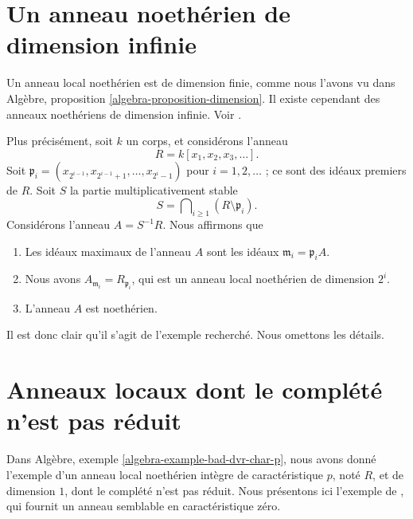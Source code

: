 \section{Un anneau noethérien de dimension infinie}
\label{section-Noetherian-infinite-dimension}

\noindent
Un anneau local noethérien est de dimension finie, comme nous l'avons vu dans
Algèbre, proposition \ref{algebra-proposition-dimension}.
Il existe cependant des anneaux noethériens de dimension infinie.
Voir \cite[Appendix, exemple 1]{Nagata}.

\medskip\noindent
Plus précisément, soit $k$ un corps, et considérons l'anneau
$$
R = k[x_1, x_2, x_3, \ldots ].
$$
Soit $\mathfrak p_i = (x_{2^{i - 1}}, x_{2^{i - 1} + 1}, \ldots, x_{2^i - 1})$
pour $i = 1, 2, \ldots$ ; ce sont des idéaux premiers de $R$. Soit $S$
la partie multiplicativement stable
$$
S = \bigcap\nolimits_{i \geq 1} (R \setminus \mathfrak p_i).
$$
Considérons l'anneau $A = S^{-1}R$.
Nous affirmons que
\begin{enumerate}
\item Les idéaux maximaux de l'anneau $A$ sont les idéaux
$\mathfrak m_i = \mathfrak p_iA$.
\item Nous avons $A_{\mathfrak m_i} = R_{\mathfrak p_i}$, qui est
un anneau local noethérien de dimension $2^i$.
\item L'anneau $A$ est noethérien.
\end{enumerate}
Il est donc clair qu'il s'agit de l'exemple recherché.
Nous omettons les détails.




\section{Anneaux locaux dont le complété n'est pas réduit}
\label{section-local-completion-nonreduced}

\noindent
Dans Algèbre, exemple \ref{algebra-example-bad-dvr-char-p}, nous avons donné l'exemple
d'un anneau local noethérien intègre de caractéristique $p$, noté $R$, et de dimension $1$,
dont le complété n'est pas réduit. Nous présentons ici l'exemple
de \cite[Proposition 3.1]{Ferrand-Raynaud}, qui fournit un anneau semblable
en caractéristique zéro.

